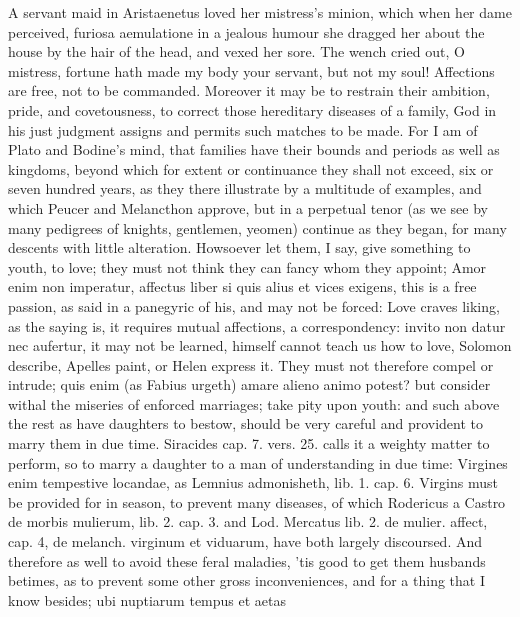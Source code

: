 A servant maid in Aristaenetus loved her mistress's minion, which
when her dame perceived, furiosa aemulatione in a jealous humour she
dragged her about the house by the hair of the head, and vexed her
sore. The wench cried out, O mistress, fortune hath made my body
your servant, but not my soul! Affections are free, not to be
commanded. Moreover it may be to restrain their ambition, pride, and
covetousness, to correct those hereditary diseases of a family, God in
his just judgment assigns and permits such matches to be made. For I am
of Plato and  Bodine's mind, that families have their bounds and
periods as well as kingdoms, beyond which for extent or continuance
they shall not exceed, six or seven hundred years, as they there
illustrate by a multitude of examples, and which Peucer and
Melancthon approve, but in a perpetual tenor (as we see by many
pedigrees of knights, gentlemen, yeomen) continue as they began, for
many descents with little alteration. Howsoever let them, I say, give
something to youth, to love; they must not think they can fancy whom
they appoint; Amor enim non imperatur, affectus liber si quis
alius et vices exigens, this is a free passion, as \Pliny{} said in a
panegyric of his, and may not be forced: Love craves liking, as the
saying is, it requires mutual affections, a correspondency: invito non
datur nec aufertur, it may not be learned, \Ovid himself cannot teach us
how to love, Solomon describe, Apelles paint, or Helen express it. They
must not therefore compel or intrude; quis enim (as Fabius
urgeth) amare alieno animo potest? but consider withal the miseries of
enforced marriages; take pity upon youth: and such above the rest as
have daughters to bestow, should be very careful and provident to marry
them in due time. Siracides cap. 7. vers. 25. calls it a weighty matter
to perform, so to marry a daughter to a man of understanding in due
time: Virgines enim tempestive locandae, as Lemnius admonisheth,
lib. 1. cap. 6. Virgins must be provided for in season, to prevent many
diseases, of which Rodericus a Castro de morbis mulierum, lib. 2.
cap. 3. and Lod. Mercatus lib. 2. de mulier. affect, cap. 4, de
melanch. virginum et viduarum, have both largely discoursed. And
therefore as well to avoid these feral maladies, 'tis good to get them
husbands betimes, as to prevent some other gross inconveniences, and
for a thing that I know besides; ubi nuptiarum tempus et aetas
